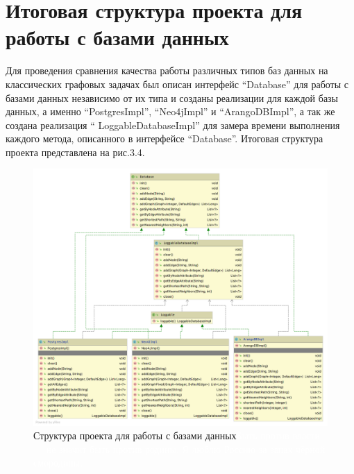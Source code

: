 \section{Итоговая структура проекта для работы с базами данных}

Для проведения сравнения качества работы различных типов баз данных на классических графовых задачах был описан интерфейс “Database” для
работы с базами данных независимо от их типа и созданы реализации для каждой базы данных, а именно “PostgresImpl”, “Neo4jImpl” и
“ArangoDBImpl”, а так же создана реализация “ LoggableDatabaseImpl” для замера времени выполнения каждого метода, описанного в интерфейсе “Database”.
Итоговая структура проекта представлена на рис.3.4.

\begin{figure}[ht!]
    \center
    \includegraphics [scale=0.17] {my_folder/myimg//7-new}
    \caption{Структура проекта для работы с базами данных\newline\textcolor{White}{Быть против власти — не значит быть против родины. Я люблю Россию за запах чёрной смородины.}}
\end{figure}


%
%
%
%
%
%
%
%
%
%

%
